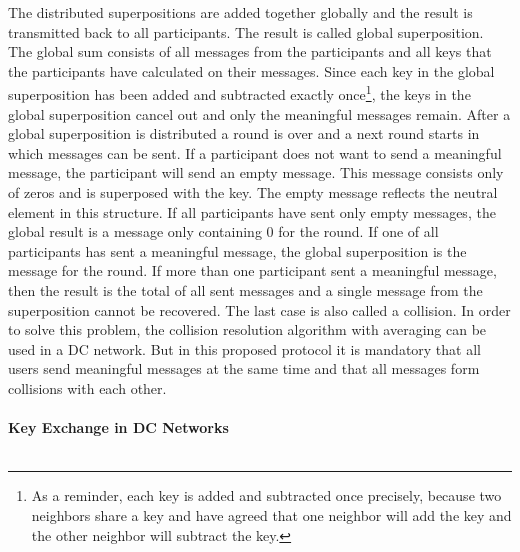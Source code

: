 The distributed superpositions are added together globally and the result is transmitted back to all participants. The result is called global superposition. The global sum consists of all messages from the participants and all keys that the participants have calculated on their messages. Since each key in the global superposition has been added and subtracted exactly once\footnote[3]{As a reminder, each key is added and subtracted once precisely, because two neighbors share a key and have agreed that one neighbor will add the key and the other neighbor will subtract the key.}, the keys in the global superposition cancel out and only the meaningful messages remain. After a global superposition is distributed a round is over and a next round starts in which messages can be sent. If a participant does not want to send a meaningful message, the participant will send an empty message. This message consists only of zeros and is superposed with the key. The empty message reflects the neutral element in this structure. If all participants have sent only empty messages, the global result is a message only containing 0 for the round. If one of all participants has sent a meaningful message, the global superposition is the message for the round. If more than one participant sent a meaningful message, then the result is the total of all sent messages and a single message from the superposition cannot be recovered. The last case is also called a collision. In order to solve this problem, the collision resolution algorithm with averaging can be used in a DC network. But in this proposed protocol it is mandatory that all users send meaningful messages at the same time and that all messages form collisions with each other. %
\\
\\
\textbf{Key Exchange in DC Networks}
\label{subsec:key_ex}
\\
\\
